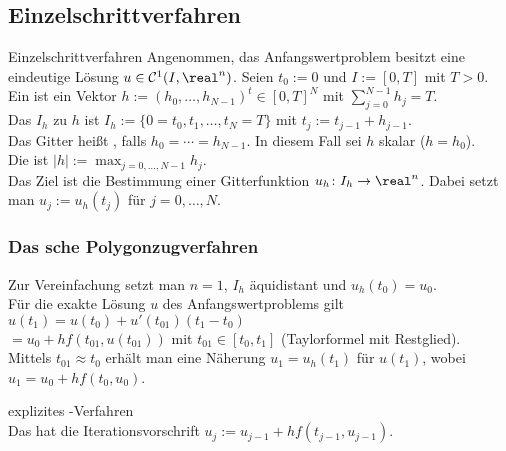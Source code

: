\pagebreak

\subsection{%
    Einzelschrittverfahren%
}

\begin{Def}{Einzelschrittverfahren}
    Angenommen, das Anfangswertproblem besitzt eine eindeutige Lösung
    $u \in \C^1(I, \real^n)$.
    Seien $t_0 := 0$ und $I := [0, T]$ mit $T > 0$.\\
    Ein  ist ein Vektor
    $h := (h_0, \dotsc, h_{N-1})^t \in [0, T]^N$ mit
    $\sum_{j=0}^{N-1} h_j = T$.\\
    Das  $I_h$ zu $h$ ist
    $I_h := \{0 = t_0, t_1, \dotsc, t_N = T\}$ mit
    $t_j := t_{j-1} + h_{j-1}$.\\
    Das Gitter heißt , falls $h_0 = \dotsb = h_{N-1}$.
    In diesem Fall sei $h$ skalar ($h = h_0$).\\
    Die  ist $|h| := \max_{j=0,\dotsc,N-1} h_j$.\\
    Das Ziel ist die Bestimmung einer Gitterfunktion
    $u_h\colon I_h \rightarrow \real^n$.
    Dabei setzt man $u_j := u_h(t_j)$ für $j = 0, \dotsc, N$.
\end{Def}

\subsubsection{%
    Das sche Polygonzugverfahren%
}

\begin{Bem}
    Zur Vereinfachung setzt man $n = 1$,
    $I_h$ äquidistant und $u_h(t_0) = u_0$.\\
    Für die exakte Lösung $u$ des Anfangswertproblems gilt
    $u(t_1) = u(t_0) + u'(t_{01}) (t_1 - t_0)$\\
    $= u_0 + h f(t_{01}, u(t_{01}))$
    mit $t_{01} \in [t_0, t_1]$ (Taylorformel mit Restglied).\\
    Mittels $t_{01} \approx t_0$ erhält man eine Näherung
    $u_1 = u_h(t_1)$ für $u(t_1)$, wobei
    $u_1 = u_0 + h f(t_0, u_0)$.
\end{Bem}

\begin{Def}{explizites -Verfahren}\\
    Das  hat die Iterationsvorschrift
    $u_j := u_{j-1} + h f(t_{j-1}, u_{j-1})$.
\end{Def}

